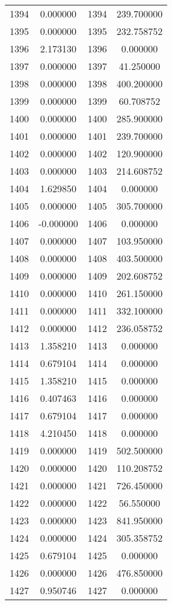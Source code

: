 \documentclass[12pt]{article}
\begin{document}
\begin{longtable}{@{}cccc@{}}
1394 & 0.000000 & 1394 & 239.700000 \\
1395 & 0.000000 & 1395 & 232.758752 \\
1396 & 2.173130 & 1396 & 0.000000 \\
1397 & 0.000000 & 1397 & 41.250000 \\
1398 & 0.000000 & 1398 & 400.200000 \\
1399 & 0.000000 & 1399 & 60.708752 \\
1400 & 0.000000 & 1400 & 285.900000 \\
1401 & 0.000000 & 1401 & 239.700000 \\
1402 & 0.000000 & 1402 & 120.900000 \\
1403 & 0.000000 & 1403 & 214.608752 \\
1404 & 1.629850 & 1404 & 0.000000 \\
1405 & 0.000000 & 1405 & 305.700000 \\
1406 & -0.000000 & 1406 & 0.000000 \\
1407 & 0.000000 & 1407 & 103.950000 \\
1408 & 0.000000 & 1408 & 403.500000 \\
1409 & 0.000000 & 1409 & 202.608752 \\
1410 & 0.000000 & 1410 & 261.150000 \\
1411 & 0.000000 & 1411 & 332.100000 \\
1412 & 0.000000 & 1412 & 236.058752 \\
1413 & 1.358210 & 1413 & 0.000000 \\
1414 & 0.679104 & 1414 & 0.000000 \\
1415 & 1.358210 & 1415 & 0.000000 \\
1416 & 0.407463 & 1416 & 0.000000 \\
1417 & 0.679104 & 1417 & 0.000000 \\
1418 & 4.210450 & 1418 & 0.000000 \\
1419 & 0.000000 & 1419 & 502.500000 \\
1420 & 0.000000 & 1420 & 110.208752 \\
1421 & 0.000000 & 1421 & 726.450000 \\
1422 & 0.000000 & 1422 & 56.550000 \\
1423 & 0.000000 & 1423 & 841.950000 \\
1424 & 0.000000 & 1424 & 305.358752 \\
1425 & 0.679104 & 1425 & 0.000000 \\
1426 & 0.000000 & 1426 & 476.850000 \\
1427 & 0.950746 & 1427 & 0.000000 \\

\end{longtable}
\end{document}
